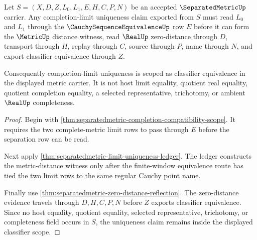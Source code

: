 \begin{theorem}
\label{thm:separatedmetric-completion-limit-uniqueness-scope}
Let $S=(X,D,Z,L_0,L_1,E,H,C,P,N)$ be an accepted $\SeparatedMetricUp$ carrier. Any completion-limit uniqueness claim exported from $S$ must read $L_0$ and $L_1$ through the $\CauchySequenceEquivalenceUp$ row $E$ before it can form the $\MetricUp$ distance witness, read $\RealUp$ zero-distance through $D$, transport through $H$, replay through $C$, source through $P$, name through $N$, and export classifier equivalence through $Z$.

Consequently completion-limit uniqueness is scoped as classifier equivalence in the displayed metric carrier. It is not host limit equality, quotient real equality, quotient completion equality, a selected representative, trichotomy, or ambient $\RealUp$ completeness.
\end{theorem}
\begin{proof}
Begin with \autoref{thm:separatedmetric-completion-compatibility-scope}. It requires the two complete-metric limit rows to pass through $E$ before the separation row can be read.

Next apply \autoref{thm:separatedmetric-limit-uniqueness-ledger}. The ledger constructs the metric-distance witness only after the finite-window equivalence route has tied the two limit rows to the same regular Cauchy point name.

Finally use \autoref{thm:separatedmetric-zero-distance-reflection}. The zero-distance evidence travels through $D,H,C,P,N$ before $Z$ exports classifier equivalence. Since no host equality, quotient equality, selected representative, trichotomy, or completeness field occurs in $S$, the uniqueness claim remains inside the displayed classifier scope.
\end{proof}

